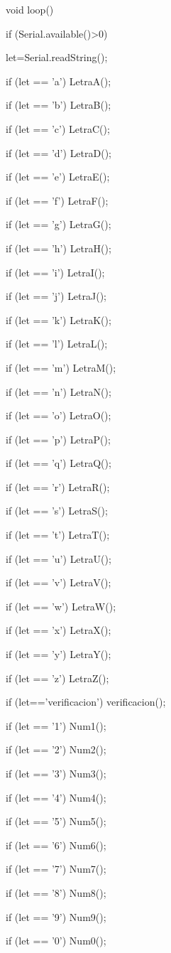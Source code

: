 \documentclass{article}
\begin{document}
void loop(){

  if (Serial.available()>0)

  {
    let=Serial.readString();
   
  }
  if (let == 'a') {
    LetraA();}
  
  if (let == 'b'){
    LetraB();}
  
  if (let == 'c') {
    LetraC();}
  
  if (let == 'd') {
    LetraD();}
  
  if (let == 'e') {
    LetraE();}
  
  if (let == 'f') {
    LetraF();}

  if (let == 'g') {
    LetraG();}

  if (let == 'h') {
    LetraH();}

  if (let == 'i') {
    LetraI();}

  if (let == 'j') {
    LetraJ();}

  if (let == 'k') {
    LetraK();}

  if (let == 'l') {
    LetraL();}

  if (let == 'm') {
    LetraM();}

  if (let == 'n') {
    LetraN();}

  if (let == 'o') {
    LetraO();}

  if (let == 'p') {
    LetraP();}

  if (let == 'q') {
    LetraQ();}

   if (let == 'r') {
    LetraR();}

  if (let == 's') {
    LetraS();}

  if (let == 't') {
    LetraT();}

  if (let == 'u') {
    LetraU();}

  if (let == 'v') {
    LetraV();}

  if (let == 'w') {
    LetraW();}

  if (let == 'x') {
    LetraX();}

  if (let == 'y') {
    LetraY();}

  if (let == 'z') {
    LetraZ();}

  if (let=='verificacion'){
    verificacion();}


  if (let == '1'){
    Num1();}
  
  if (let == '2'){
    Num2();}
  
  if (let == '3'){
    Num3();}
  
  if (let == '4'){
    Num4();}
  
  if (let == '5'){
    Num5();}
  
  if (let == '6'){
    Num6();}
  
  if (let == '7'){
    Num7();}
  
  if (let == '8'){
    Num8();}
  
  if (let == '9'){
    Num9();}
  
  if (let == '0'){
    Num0();}
 
  
}
   
\end{document}
